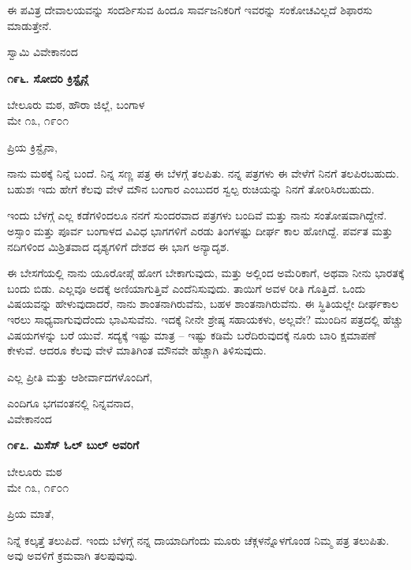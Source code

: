 ಈ ಪವಿತ್ರ ದೇವಾಲಯವನ್ನು ಸಂದರ್ಶಿಸುವ ಹಿಂದೂ ಸಾರ್ವಜನಿಕರಿಗೆ ಇವರನ್ನು ಸಂಕೋಚವಿಲ್ಲದೆ ಶಿಫಾರಸು ಮಾಡುತ್ತೇನೆ.

\begin{flushright}
ಸ್ವಾಮಿ ವಿವೇಕಾನಂದ
\end{flushright}

\begin{center}
\textbf{೧೯೬. ಸೋದರಿ ಕ್ರಿಸ್ಟೈನ್ಗೆ}
\end{center}

\begin{flushright}
ಬೇಲೂರು ಮಠ, ಹೌರಾ ಜಿಲ್ಲೆ, ಬಂಗಾಳ\\ಮೇ ೧೩, ೧೯೦೧
\end{flushright}

ಪ್ರಿಯ ಕ್ರಿಸ್ಟೈನಾ,

ನಾನು ಮಠಕ್ಕೆ ನಿನ್ನೆ ಬಂದೆ. ನಿನ್ನ ಸಣ್ಣ ಪತ್ರ ಈ ಬೆಳಗ್ಗೆ ತಲಪಿತು. ನನ್ನ ಪತ್ರಗಳು ಈ ವೇಳೆಗೆ ನಿನಗೆ ತಲಪಿರಬಹುದು. ಬಹುಶಃ ಇದು ಹೇಗೆ ಕೆಲವು ವೇಳೆ ಮೌನ ಬಂಗಾರ ಎಂಬುದರ ಸ್ವಲ್ಪ ರುಚಿಯನ್ನು ನಿನಗೆ ತೋರಿಸಿರಬಹುದು.

ಇಂದು ಬೆಳಗ್ಗೆ ಎಲ್ಲ ಕಡೆಗಳಿಂದಲೂ ನನಗೆ ಸುಂದರವಾದ ಪತ್ರಗಳು ಬಂದಿವೆ ಮತ್ತು ನಾನು ಸಂತೋಷವಾಗಿದ್ದೇನೆ. ಅಸ್ಸಾಂ ಮತ್ತು ಪೂರ್ವ ಬಂಗಾಳದ ವಿವಿಧ ಭಾಗಗಳಿಗೆ ಎರಡು ತಿಂಗಳಷ್ಟು ದೀರ್ಘ ಕಾಲ ಹೋಗಿದ್ದೆ. ಪರ್ವತ ಮತ್ತು ನದಿಗಳಿಂದ ಮಿಶ್ರಿತವಾದ ದೃಶ್ಯಗಳಿಗೆ ದೇಶದ ಈ ಭಾಗ ಅನ್ಯಾದೃಶ.

ಈ ಬೇಸಗೆಯಲ್ಲಿ ನಾನು ಯೂರೋಪ್ಗೆ ಹೋಗ ಬೇಕಾಗುವುದು, ಮತ್ತು ಅಲ್ಲಿಂದ ಅಮೆರಿಕಾಗೆ, ಅಥವಾ ನೀನು ಭಾರತಕ್ಕೆ ಬಂದು ಬಿಡು. ಎಲ್ಲವೂ ಅದಕ್ಕೆ ಅಣಿಯಾಗುತ್ತಿವೆ ಎಂದೆನಿಸುವುದು. ತಾಯಿಗೆ ಅವಳ ರೀತಿ ಗೊತ್ತಿದೆ. ಒಂದು ವಿಷಯವನ್ನು ಹೇಳುವುದಾದರೆ, ನಾನು ಶಾಂತನಾಗಿರುವೆನು, ಬಹಳ ಶಾಂತನಾಗಿರುವೆನು. ಈ ಸ್ಥಿತಿಯಲ್ಲೇ ದೀರ್ಘಕಾಲ ಇರಲು ಸಾಧ್ಯವಾಗುವುದೆಂದು ಭಾವಿಸುವೆನು. ಇದಕ್ಕೆ ನೀನೇ ಶ್ರೇಷ್ಠ ಸಹಾಯಕಳು, ಅಲ್ಲವೇ? ಮುಂದಿನ ಪತ್ರದಲ್ಲಿ ಹೆಚ್ಚು ವಿಷಯಗಳನ್ನು ಬರೆ ಯುವೆ. ಸದ್ಯಕ್ಕೆ ಇಷ್ಟು ಮಾತ್ರ – ಇಷ್ಟು ಕಡಿಮೆ ಬರೆದಿರುವುದಕ್ಕೆ ನೂರು ಬಾರಿ ಕ್ಷಮಾಪಣೆ ಕೇಳುವೆ. ಆದರೂ ಕೆಲವು ವೇಳೆ ಮಾತಿಗಿಂತ ಮೌನವೇ ಹೆಚ್ಚಾಗಿ ತಿಳಿಸುವುದು.

ಎಲ್ಲ ಪ್ರೀತಿ ಮತ್ತು ಆಶೀರ್ವಾದಗಳೊಂದಿಗೆ,

\begin{flushright}
ಎಂದಿಗೂ ಭಗವಂತನಲ್ಲಿ ನಿನ್ನವನಾದ,\\ವಿವೇಕಾನಂದ
\end{flushright}

\begin{center}
\textbf{೧೯೭. ಮಿಸೆಸ್ ಓಲ್ ಬುಲ್ ಅವರಿಗೆ}
\end{center}

\begin{flushright}
ಬೇಲೂರು ಮಠ\\ಮೇ ೧೩, ೧೯೦೧
\end{flushright}

ಪ್ರಿಯ ಮಾತೆ,

ನಿನ್ನೆ ಕಲ್ಕತ್ತೆ ತಲುಪಿದೆ. ಇಂದು ಬೆಳಗ್ಗೆ ನನ್ನ ದಾಯಾದಿಗೆಂದು ಮೂರು ಚೆಕ್ಗಳನ್ನೊಳಗೊಂಡ ನಿಮ್ಮ ಪತ್ರ ತಲುಪಿತು. ಅವು ಅವಳಿಗೆ ಕ್ರಮವಾಗಿ ತಲಪುವುವು.

